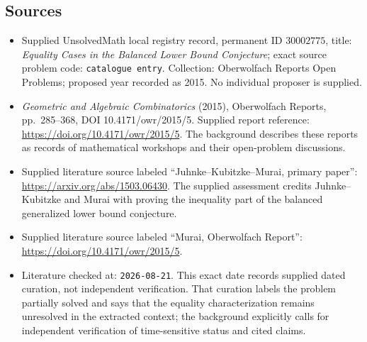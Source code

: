 \documentclass[11pt]{article}
\begin{document}
\subsection{Sources}
\begin{itemize}
\item Supplied UnsolvedMath local registry record, permanent ID \(30002775\), title: \emph{Equality Cases in the Balanced Lower Bound Conjecture}; exact source problem code: \texttt{catalogue entry}. Collection: Oberwolfach Reports Open Problems; proposed year recorded as 2015. No individual proposer is supplied.
\item \emph{Geometric and Algebraic Combinatorics} (2015), Oberwolfach Reports, pp.\ 285--368, DOI 10.4171/owr/2015/5. Supplied report reference: \url{https://doi.org/10.4171/owr/2015/5}. The background describes these reports as records of mathematical workshops and their open-problem discussions.
\item Supplied literature source labeled ``Juhnke--Kubitzke--Murai, primary paper'': \url{https://arxiv.org/abs/1503.06430}. The supplied assessment credits Juhnke--Kubitzke and Murai with proving the inequality part of the balanced generalized lower bound conjecture.
\item Supplied literature source labeled ``Murai, Oberwolfach Report'': \url{https://doi.org/10.4171/owr/2015/5}.
\item Literature checked at: \texttt{2026-08-21}. This exact date records supplied dated curation, not independent verification. That curation labels the problem partially solved and says that the equality characterization remains unresolved in the extracted context; the background explicitly calls for independent verification of time-sensitive status and cited claims.
\end{itemize}
\end{document}
